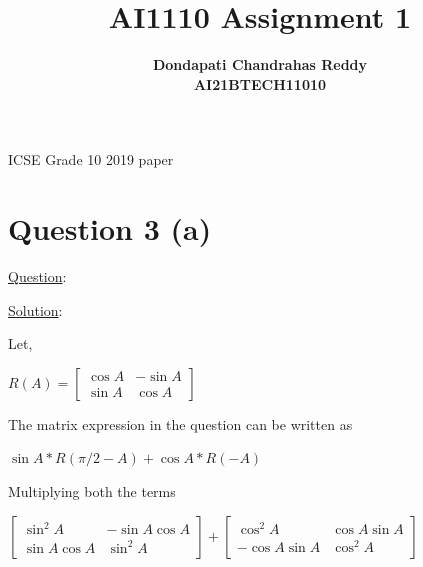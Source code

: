 \documentclass[journal,12pt,twocolumn]{IEEEtran}
\begin{document}
\title{\textbf{AI1110 Assignment 1} }
\author{\textbf{Dondapati Chandrahas Reddy}\\\textbf{AI21BTECH11010}}
\maketitle
\begin{center}
{ ICSE Grade 10 2019 paper}\end{center}\par
{ \section {Question 3 (a) \newline}}
{\Large \underline{Question}:}


\begin{center}
\setlength \fboxrule {0in}
\setlength \fboxsep {0.1in}
\end{center}\par

{\Large \underline{Solution}: \newline\newline }\par
Let,
\begin{center}$R(A) =\left [\begin{array}{cc}\cos A &  -\sin A \\
\sin A & \cos A\end{array}\right ]$\newline\end{center}\par

The matrix expression in the question can be written as

\begin{center}
$\sin A \ast R(\pi/2 - A) +\cos A \ast R( -A)$\newline 
\end{center}\par

Multiplying both the terms

\begin{center}
\flushleft $\left [\begin{array}{cc}\sin^2 A &  -\sin A\cos A \\
\sin A\cos A & \sin^2 A\end{array}\right ] +$\flushright $\left [\begin{array}{cc}\cos^2 A & \cos A\sin A \\
 -\cos A\sin A & \cos^2 A\end{array}\right ]$\newline
\end{center}\par
\end{document}

